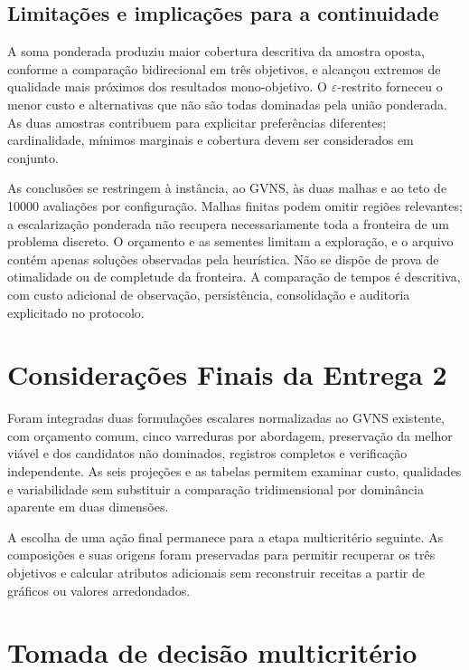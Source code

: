 \documentclass[12pt,a4paper]{article}
\begin{document}
\subsection{Limitações e implicações para a continuidade}

A soma ponderada produziu maior cobertura descritiva da amostra oposta,
conforme a comparação bidirecional em três objetivos, e alcançou extremos
de qualidade mais próximos dos resultados mono-objetivo. O
$\varepsilon$-restrito forneceu o menor custo e alternativas que não são
todas dominadas pela união ponderada. As duas amostras contribuem para
explicitar preferências diferentes; cardinalidade, mínimos marginais e
cobertura devem ser considerados em conjunto.

As conclusões se restringem à instância, ao GVNS, às duas malhas e ao teto
de \num{10000} avaliações por configuração. Malhas finitas podem omitir
regiões relevantes; a escalarização ponderada não recupera necessariamente
toda a fronteira de um problema discreto. O orçamento e as sementes
limitam a exploração, e o arquivo contém apenas soluções observadas pela
heurística. Não se dispõe de prova de otimalidade ou de completude da
fronteira. A comparação de tempos é descritiva, com custo adicional de
observação, persistência, consolidação e auditoria explicitado no protocolo.

\section{Considerações Finais da Entrega 2}

Foram integradas duas formulações escalares normalizadas ao GVNS existente,
com orçamento comum, cinco varreduras por abordagem, preservação da melhor
viável e dos candidatos não dominados, registros completos e verificação
independente. As seis projeções e as tabelas permitem examinar custo,
qualidades e variabilidade sem substituir a comparação tridimensional por
dominância aparente em duas dimensões.

A escolha de uma ação final permanece para a etapa multicritério seguinte.
As composições e suas origens foram preservadas para permitir recuperar os
três objetivos e calcular atributos adicionais sem reconstruir receitas
a partir de gráficos ou valores arredondados.



\clearpage

\section{Tomada de decisão multicritério}
\end{document}
